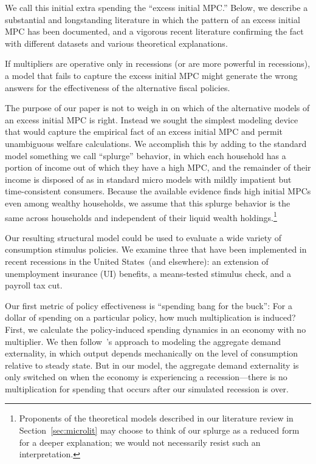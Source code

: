 \documentclass[qe,draft]{econsocart}
\theoremstyle{plain}
\theoremstyle{definition}
\begin{document}
We call this initial extra spending the ``excess initial MPC.''  Below, we describe a substantial and longstanding literature in which the pattern of an excess initial MPC has been documented, and a vigorous recent literature confirming the fact with different datasets and various theoretical explanations.

If multipliers are operative only in recessions (or are more powerful in recessions), a model that fails to capture the excess initial MPC might generate the wrong answers for the effectiveness of the alternative fiscal policies.

The purpose of our paper is not to weigh in on which of the alternative models of an excess initial MPC is right.  Instead we sought the simplest modeling device that would capture the empirical fact of an excess initial MPC and permit unambiguous welfare calculations.  We accomplish this by adding to the standard model something we call ``splurge'' behavior, in which each household has a portion of income out of which they have a high MPC, and the remainder of their income is disposed of as in standard micro models with mildly impatient but time-consistent consumers.  Because the available evidence finds high initial MPCs even among wealthy households, we assume that this splurge behavior is the same across households and independent of their liquid wealth holdings.\footnote{Proponents of the theoretical models described in our literature review in Section~\ref{sec:microlit} may choose to think of our splurge as a reduced form for a deeper explanation; we would not necessarily resist such an interpretation.}

Our resulting structural model could be used to evaluate a wide variety of consumption stimulus policies.  We examine three that have been implemented in recent recessions in the United States\ (and elsewhere): an extension of unemployment insurance (UI) benefits, a means-tested stimulus check, and a payroll tax cut.

Our first metric of policy effectiveness is ``spending bang for the buck'': For a dollar of spending on a particular policy, how much multiplication is induced?  %
First, we calculate the policy-induced spending dynamics in an economy with no multiplier.  We then follow~\cite{kmpHandbook}'s approach to modeling the aggregate demand externality, in which output depends mechanically on the level of consumption relative to steady state. But in our model, the aggregate demand externality is only switched on when the economy is experiencing a recession---there is no multiplication for spending that occurs after our simulated recession is over.  %
\end{document}
